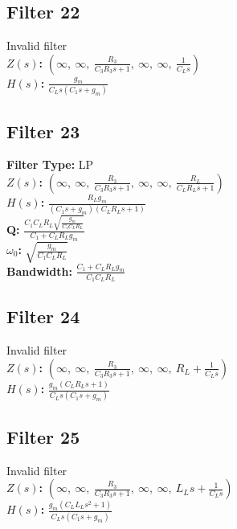 \documentclass{article}
\begin{document}
\subsection*{Filter 22}
Invalid filter \\ 
\textbf{$Z(s)$:} $\left( \infty, \  \infty, \  \frac{R_{3}}{C_{3} R_{3} s + 1}, \  \infty, \  \infty, \  \frac{1}{C_{L} s}\right)$ \\ 
\textbf{$H(s)$:} $\frac{g_{m}}{C_{L} s \left(C_{1} s + g_{m}\right)}$ \\ 
\subsection*{Filter 23}
\textbf{Filter Type:} LP \\ 
\textbf{$Z(s)$:} $\left( \infty, \  \infty, \  \frac{R_{3}}{C_{3} R_{3} s + 1}, \  \infty, \  \infty, \  \frac{R_{L}}{C_{L} R_{L} s + 1}\right)$ \\ 
\textbf{$H(s)$:} $\frac{R_{L} g_{m}}{\left(C_{1} s + g_{m}\right) \left(C_{L} R_{L} s + 1\right)}$ \\ 
\textbf{Q:} $\frac{C_{1} C_{L} R_{L} \sqrt{\frac{g_{m}}{C_{1} C_{L} R_{L}}}}{C_{1} + C_{L} R_{L} g_{m}}$ \\ 
\textbf{$\omega_0$:} $\sqrt{\frac{g_{m}}{C_{1} C_{L} R_{L}}}$ \\ 
\textbf{Bandwidth:} $\frac{C_{1} + C_{L} R_{L} g_{m}}{C_{1} C_{L} R_{L}}$ \\ 
\subsection*{Filter 24}
Invalid filter \\ 
\textbf{$Z(s)$:} $\left( \infty, \  \infty, \  \frac{R_{3}}{C_{3} R_{3} s + 1}, \  \infty, \  \infty, \  R_{L} + \frac{1}{C_{L} s}\right)$ \\ 
\textbf{$H(s)$:} $\frac{g_{m} \left(C_{L} R_{L} s + 1\right)}{C_{L} s \left(C_{1} s + g_{m}\right)}$ \\ 
\subsection*{Filter 25}
Invalid filter \\ 
\textbf{$Z(s)$:} $\left( \infty, \  \infty, \  \frac{R_{3}}{C_{3} R_{3} s + 1}, \  \infty, \  \infty, \  L_{L} s + \frac{1}{C_{L} s}\right)$ \\ 
\textbf{$H(s)$:} $\frac{g_{m} \left(C_{L} L_{L} s^{2} + 1\right)}{C_{L} s \left(C_{1} s + g_{m}\right)}$ \\ 
\end{document}
